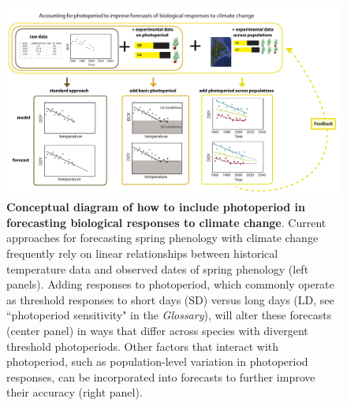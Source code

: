 \documentclass{article}
\begin{document}
 
 

\begin{figure}[p]
\includegraphics{..//..//analyses/photoperiod/figures/photocondiag6.pdf} 
\caption{\textbf{Conceptual diagram of how to include photoperiod in forecasting biological responses to climate change}. Current approaches for forecasting spring phenology with climate change frequently rely on linear relationships between historical temperature data and observed dates of spring phenology (left panels). Adding responses to photoperiod, which commonly operate as threshold responses to short days (SD) versus long days (LD, see ``photoperiod sensitivity" in the \emph{Glossary}), will alter these forecasts (center panel) in ways that differ across species with divergent threshold photoperiods. Other factors that interact with photoperiod, such as population-level variation in photoperiod responses, can be incorporated into forecasts to further improve their accuracy (right panel).}
 \label{fig:condiag}
 \end{figure}
 




\end{document}
